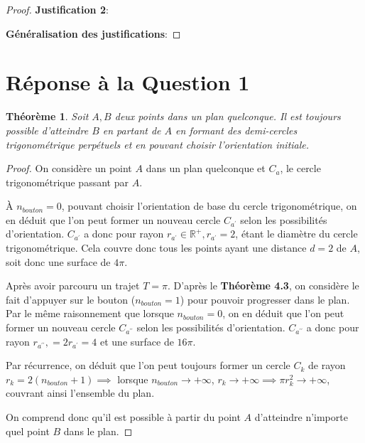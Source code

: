 \documentclass{amsart}
\newtheorem{theorem}{Théorème}[section]
\theoremstyle{definition}
\theoremstyle{remark}
\numberwithin{equation}{section}
\begin{document}
\begin{proof}
  \textbf{Justification 2}:

  \textbf{Généralisation des justifications}:
  
\end{proof}

\section{Réponse à la Question 1}

\begin{theorem}
  Soit $A,B$ deux points dans un plan quelconque. Il est toujours possible d'atteindre $B$ en partant de $A$ en formant des demi-cercles trigonométrique perpétuels et en pouvant choisir l'orientation initiale.
\end{theorem}

\begin{proof}
  On considère un point $A$ dans un plan quelconque et $C_a$, le cercle trigonométrique passant par $A$.

  À $n_{bouton}=0$, pouvant choisir l'orientation de base du cercle trigonométrique, on en déduit que l'on peut former un nouveau cercle $C_{a^\prime}$ selon les possibilités d'orientation.  $C_{a^\prime}$ a donc pour rayon $r_{a^\prime}\in\mathbb{R^+}, r_{a^\prime}=2$, étant le 
  diamètre du cercle trigonométrique. Cela couvre donc tous les points ayant une distance $d=2$ de $A$, soit donc une surface de $4\pi$.

  Après avoir parcouru un trajet $T=\pi$. D'après le \textbf{Théorème 4.3}, on considère le fait d'appuyer sur le bouton ($n_{bouton}=1$) pour pouvoir progresser dans le plan. Par le même raisonnement que lorsque $n_{bouton}=0$,
  on en déduit que l'on peut former un nouveau cercle $C_{a^{\prime\prime}}$ selon les possibilités d'orientation.  $C_{a^{\prime\prime}}$ a donc pour rayon $r_{a^{\prime\prime}},=2r_{a^\prime}=4$ et une surface de $16\pi$.

  Par récurrence, on déduit que l'on peut toujours former un cercle $C_k$ de rayon $r_k=2(n_{bouton}+1) \implies$ lorsque $n_{bouton}\to+\infty$, $r_k\to+\infty \implies {\pi}r_k^2\to+\infty$, couvrant ainsi l'ensemble du plan.

  On comprend donc qu'il est possible à partir du point $A$ d'atteindre n'importe quel point $B$ dans le plan.



\end{proof}
\end{document}
